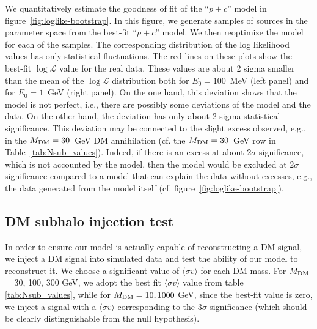 \documentclass[12pt, a4paper]{article}
\newcommand{\sigmav}{\langle \sigma v \rangle}
\newcommand{\mdm}{{M_{\rm DM}}}
\begin{document}
We quantitatively estimate the goodness of fit of the ``$p + c$'' model in figure~\ref{fig:loglike-bootstrap}.
In this figure, we generate samples of sources in the parameter space from the best-fit ``$p + c$'' model. We then reoptimize the model for each of the samples.
The corresponding distribution of the log likelihood values has only statistical fluctuations.
The red lines on these plots show the best-fit $\log \mathcal{L}$ value for the real data.
These values are about 2 sigma smaller than the mean of the $\log \mathcal{L}$ distribution both for $E_0 = 100$~MeV (left panel) and for $E_0 = 1$~GeV (right panel).
On the one hand, this deviation shows that the model is not perfect, i.e., there are possibly some deviations of the model and the data.
On the other hand, the deviation has only about 2 sigma statistical significance.
This deviation may be connected to the slight excess observed, e.g., in the $\mdm = 30$~GeV DM annihilation (cf. the $\mdm = 30$~GeV row in Table~\ref{tab:Nsub_values}).
{Indeed, if there is an excess at about $2\sigma$ significance, which is not accounted by the model, then the model would be excluded at $2 \sigma$ significance compared to a model that can explain the data without excesses, e.g., the data generated from the model itself (cf. figure~\ref{fig:loglike-bootstrap}).}


\subsection{DM subhalo injection test}
\label{app:DM_injection}

In order to ensure our model is actually capable of reconstructing a DM signal, we inject a DM signal into simulated data and test the ability of our model to reconstruct it.
We choose a significant value of $\sigmav$ for each DM mass. For $\mdm$ = 30, 100, 300 GeV, we adopt the best fit $\sigmav$ value from table \ref{tab:Nsub_values}, while for $\mdm = 10, 1000$ GeV, since the best-fit value is zero, we inject a signal with a $\sigmav$ corresponding to the 3$\sigma$ significance (which should be clearly distinguishable from the null hypothesis). 
\end{document}
